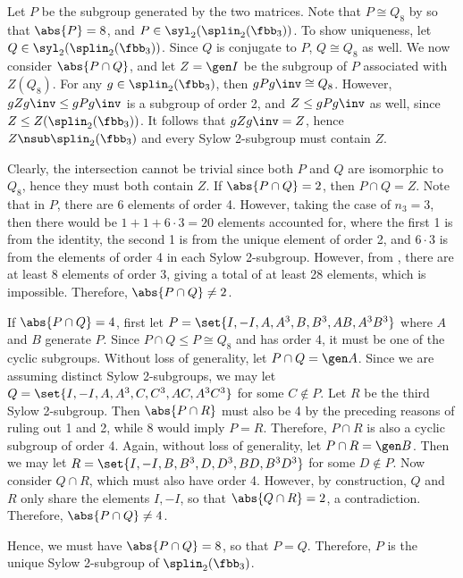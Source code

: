 \begin{sol}
	Let $P$ be the subgroup generated by the two matrices.
	Note that $P \cong Q_8$ by  so that $\abs{P} = 8$, and $P \in \syl_2(\splin_2(\fbb_3))$.
	To show uniqueness, let $Q \in \syl_2(\splin_2(\fbb_3))$.
	Since $Q$ is conjugate to $P$, $Q \cong Q_8$ as well.
	We now consider $\abs{P \cap Q}$, and let $Z = \gen I$ be the subgroup of $P$ associated with $Z(Q_8)$.
	For any $g \in \splin_2(\fbb_3)$, then $gPg\inv \cong Q_8$.
	However, $gZg\inv \leq gPg\inv$ is a subgroup of order 2, and $Z \leq gPg\inv$ as well, since $Z \leq Z(\splin_2(\fbb_3))$.
	It follows that $gZg\inv = Z$, hence $Z \nsub \splin_2(\fbb_3)$ and every Sylow 2-subgroup must contain $Z$.

	Clearly, the intersection cannot be trivial since both $P$ and $Q$ are isomorphic to $Q_8$, hence they must both contain $Z$.
	If $\abs{P \cap Q} = 2$, then $P \cap Q = Z$.
	Note that in $P$, there are 6 elements of order 4.
	However, taking the case of $n_3 = 3$, then there would be $1 + 1 + 6 \cdot 3 = 20$ elements accounted for, where the first 1 is from the identity, the second 1 is from the unique element of order 2, and $6 \cdot 3$ is from the elements of order 4 in each Sylow 2-subgroup.
	However, from , there are at least 8 elements of order 3, giving a total of at least 28 elements, which is impossible.
	Therefore, $\abs{P \cap Q} \neq 2$.

	If $\abs{P \cap Q} = 4$, first let $P = \set{I, -I, A, A^3, B, B^3, AB, A^3B^3}$ where $A$ and $B$ generate $P$.
	Since $P \cap Q \leq P \cong Q_8$ and has order 4, it must be one of the cyclic subgroups.
	Without loss of generality, let $P \cap Q = \gen A$.
	Since we are assuming distinct Sylow 2-subgroups, we may let $Q = \set{I, -I, A, A^3, C, C^3, AC, A^3C^3}$ for some $C \notin P$.
	Let $R$ be the third Sylow 2-subgroup.
	Then $\abs{P \cap R}$ must also be 4 by the preceding reasons of ruling out 1 and 2, while 8 would imply $P = R$.
	Therefore, $P \cap R$ is also a cyclic subgroup of order 4.
	Again, without loss of generality, let $P \cap R = \gen B$.
	Then we may let $R = \set{I, -I, B, B^3, D, D^3, BD, B^3D^3}$ for some $D \notin P$.
	Now consider $Q \cap R$, which must also have order 4.
	However, by construction, $Q$ and $R$ only share the elements $I, -I$, so that $\abs{Q \cap R} = 2$, a contradiction.
	Therefore, $\abs{P \cap Q} \neq 4$.

	Hence, we must have $\abs{P \cap Q} = 8$, so that $P = Q$.
	Therefore, $P$ is the unique Sylow 2-subgroup of $\splin_2(\fbb_3)$.
\end{sol}

